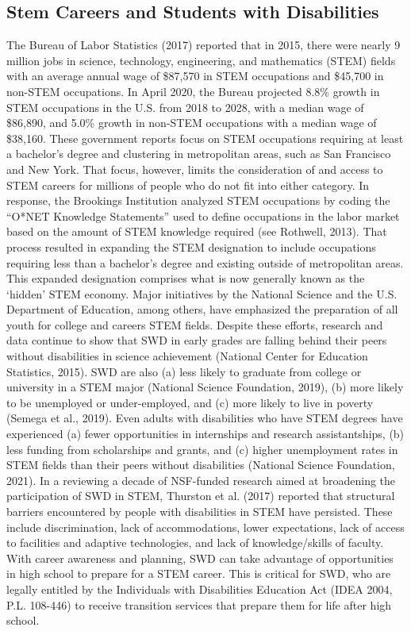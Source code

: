 \documentclass[11.5pt]{sig-alternate}
\begin{document}
\begin{large}
\subsection*{Stem Careers and Students with Disabilities}
The Bureau of Labor Statistics (2017) reported that in 2015, there were nearly 9 million jobs in science, technology, engineering, and mathematics (STEM) fields with an average annual wage of \$87,570 in STEM occupations and \$45,700 in non-STEM occupations. In April 2020, the Bureau projected 8.8\% growth in STEM occupations in the U.S. from 2018 to 2028, with a median wage of \$86,890, and 5.0\% growth in non-STEM occupations with a median wage of \$38,160. These government reports focus on STEM occupations requiring at least a bachelor’s degree and clustering in metropolitan areas, such as San Francisco and New York. That focus, however, limits the consideration of and access to STEM careers for millions of people who do not fit into either category. In response, the Brookings Institution analyzed STEM occupations by coding the “O*NET Knowledge Statements” used to define occupations in the labor market based on the amount of STEM knowledge required (see Rothwell, 2013). That process resulted in expanding the STEM designation to include occupations requiring less than a bachelor’s degree and existing outside of metropolitan areas. This expanded designation comprises what is now generally known as the ‘hidden’ STEM economy. 
Major initiatives by the National Science and the U.S. Department of Education, among others, have emphasized the preparation of all youth for college and careers STEM fields. Despite these efforts, research and data continue to show that SWD in early grades are falling behind their peers without disabilities in science achievement (National Center for Education Statistics, 2015). SWD are also (a) less likely to graduate from college or university in a STEM major (National Science Foundation, 2019), (b) more likely to be unemployed or under-employed, and (c) more likely to live in poverty (Semega et al., 2019). Even adults with disabilities who have STEM degrees have experienced (a) fewer opportunities in internships and research assistantships, (b) less funding from scholarships and grants, and (c) higher unemployment rates in STEM fields than their peers without disabilities (National Science Foundation, 2021). In a reviewing a decade of NSF-funded research aimed at broadening the participation of SWD in STEM, Thurston et al. (2017) reported that structural barriers  encountered by people with disabilities in STEM have persisted. These include discrimination, lack of accommodations, lower expectations, lack of access to facilities and adaptive technologies, and lack of knowledge/skills of faculty. With career awareness and planning, SWD can take advantage of opportunities in high school to prepare for a STEM career. This is critical for SWD, who are legally entitled by the Individuals with Disabilities Education Act (IDEA 2004, P.L. 108-446) to receive transition services that prepare them for life after high school. 

\end{large}
\end{document}
